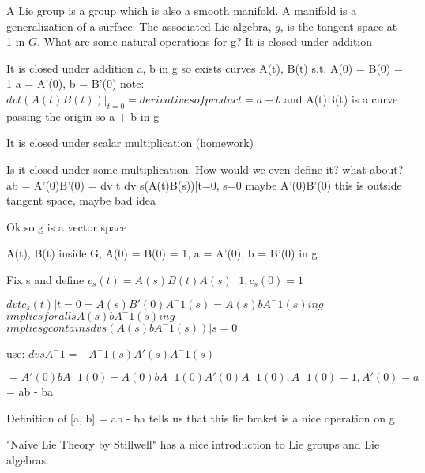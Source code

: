 \begin{multicols}{3}
  A Lie group is a group which is also a smooth manifold. A manifold is a generalization of a surface.
  The associated Lie algebra, $g$, is the tangent space at 1 in $G$.
  What are some natural operations for g?
  It is closed under addition
\end{multicols}



It is closed under addition
a, b in g
so
exists curves A(t), B(t) s.t.
A(0) = B(0) = 1
a = A'(0), b = B'(0)
note:
$dv t (A(t)B(t))|_{t=0} = derivatives of product = a + b$
and A(t)B(t) is a curve passing the origin so
a + b in g

It is closed under scalar multiplication (homework)

Is it closed under some multiplication. How would we even define it?
what about?
ab = A'(0)B'(0) = dv t dv s(A(t)B(s))|t=0, s=0
maybe A'(0)B'(0) this is outside tangent space, maybe bad idea

Ok so g is a vector space

A(t), B(t) inside G, A(0) = B(0) = 1, a = A'(0), b = B'(0) in g

Fix s and define
$c_s(t) = A(s)B(t)A(s)^-1, c_s(0) = 1$

$dv t c_s(t)|t=0 = A(s)B'(0)A^-1(s) = A(s)bA^-1(s) in g$
$implies forall s A(s)bA^-1(s) in g$
$implies g contains dv s (A(s)bA^-1(s))|s=0$

use:
$dv s A^-1 = -A^-1(s)A'(s)A^-1(s)$

$= A'(0)bA^-1(0) - A(0)bA^-1(0)A'(0)A^-1(0), A^-1(0) = 1, A'(0) = a$
= ab - ba

Definition of [a, b] = ab - ba tells us that this lie braket is a nice
operation on g


"Naive Lie Theory by Stillwell" has a nice introduction to Lie groups
and Lie algebras.





